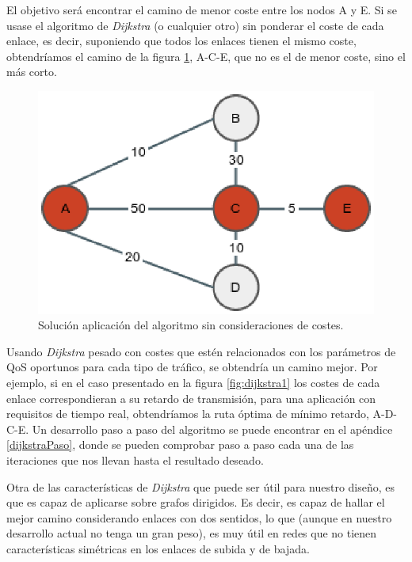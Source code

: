 \documentclass[a4paper,11pt]{book}
\begin{document}
El objetivo será encontrar el camino de menor coste entre los nodos A y E. Si se usase el algoritmo de \textit{Dijkstra} (o cualquier otro) sin ponderar el coste de cada enlace, es decir, suponiendo que todos los enlaces tienen el mismo coste, obtendríamos el camino de la figura \ref{dijkstraMal}, A-C-E, que no es el de menor coste, sino el más corto.

\begin{figure}
\centering
\includegraphics[scale=0.5]{./figuras/dijkstraMal}
\caption[Resultado aplicación sin costes.]{Solución aplicación del algoritmo sin consideraciones de costes.}\label{dijkstraMal}
\end{figure}

Usando \textit{Dijkstra} pesado con costes que estén relacionados con los parámetros de \ac{QoS} oportunos para cada tipo de tráfico, se obtendría un camino mejor. Por ejemplo, si en el caso presentado en la figura \ref{fig:dijkstra1} los costes de cada enlace correspondieran a su retardo de transmisión, para una aplicación con requisitos de tiempo real, obtendríamos la ruta óptima de mínimo retardo, A-D-C-E. Un desarrollo paso a paso del algoritmo se puede encontrar en el apéndice \ref{dijkstraPaso}, donde se pueden comprobar paso a paso cada una de las iteraciones que nos llevan hasta el resultado deseado.

 Otra de las características de \textit{Dijkstra} que puede ser útil para nuestro diseño, es que es capaz de aplicarse sobre grafos dirigidos. Es decir, es capaz de hallar el mejor camino considerando enlaces con dos sentidos, lo que (aunque en nuestro desarrollo actual no tenga un gran peso), es muy útil en redes que no tienen características simétricas en los enlaces de subida y de bajada.
 
\end{document}
